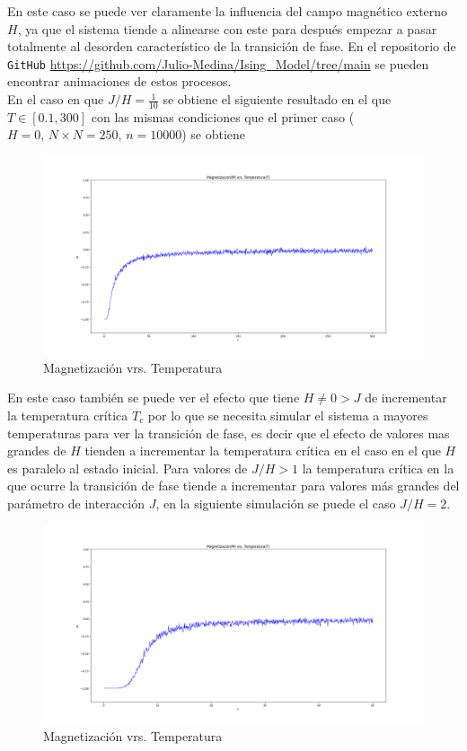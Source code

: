 \documentclass[a4paper]{article}
\begin{document}
En este caso se puede ver claramente la influencia del campo magnético externo $H$, ya que el sistema tiende a alinearse con este para después empezar a pasar totalmente al desorden característico de la transición de fase. En el repositorio de \texttt{GitHub} \url{https://github.com/Julio-Medina/Ising_Model/tree/main} se pueden encontrar animaciones de estos procesos.\\

En el caso en que $J/H=\frac{1}{10}$ se obtiene el siguiente resultado en el que $T\in[0.1,300]$ con las mismas condiciones que el primer caso ($H=0 ,\, N\times N=250,\, n=10000 $) se obtiene
\begin{figure}[H]
\begin{center}
\includegraphics[scale=0.3]{PlotMvT_sim12.png} 
\end{center} 
\caption{Magnetización vrs. Temperatura}
\end{figure}
En este caso también se puede ver el efecto que tiene $H\neq0>J$ de incrementar la temperatura crítica $T_c$ por lo que se necesita simular el sistema a mayores temperaturas para ver la transición de fase, es decir que el efecto de valores mas grandes de $H$ tienden a incrementar la temperatura crítica en el caso en el que $H$ es paralelo al estado inicial.
Para valores de $J/H>1$ la temperatura crítica en la que ocurre la transición de fase tiende a incrementar para valores más grandes del parámetro de interacción $J$, en la siguiente simulación se puede el caso $J/H=2$.
\begin{figure}[H]
\begin{center}
\includegraphics[scale=0.3]{PlotMvT_sim13.png} 
\end{center} 
\caption{Magnetización vrs. Temperatura}
\end{figure}
\end{document}
